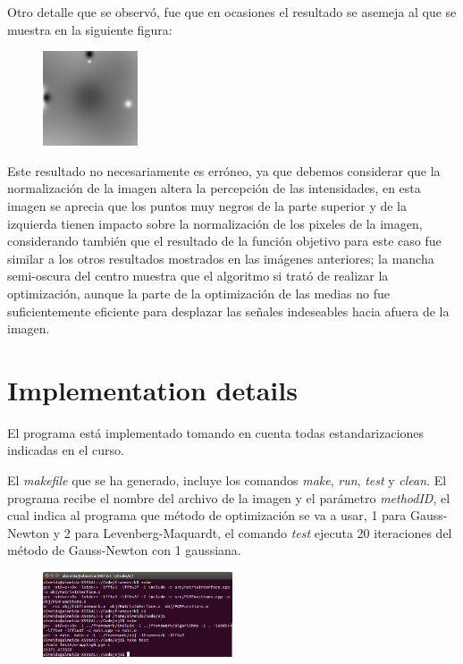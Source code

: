 \documentclass[10pt,journal,compsoc]{styles/IEEEtran}
\begin{document}
Otro detalle que se observ\'o, fue que en ocasiones el resultado se asemeja al que se muestra en la siguiente figura:\\

\begin{figure}[H]
\centering
\includegraphics[width=0.25\textwidth]{case.png}
\caption*{}
\end{figure}

Este resultado no necesariamente es erróneo, ya que debemos considerar que la normalización de la imagen altera la percepción de las intensidades, en esta imagen se aprecia que los puntos muy negros de la parte superior y de la izquierda tienen impacto sobre la normalización de los pixeles de la imagen, considerando también que el resultado de la función objetivo para este caso fue similar a los otros resultados mostrados en las imágenes anteriores; la mancha semi-oscura del centro muestra que el algoritmo si trat\'o de realizar la optimización, aunque la parte de la optimización de las medias no fue suficientemente eficiente para desplazar las señales indeseables hacia afuera de la imagen.\\ 





\appendix
\section{Implementation details}
El programa est\'a implementado tomando en cuenta todas estandarizaciones indicadas en el curso.

El \textit{makefile} que se ha generado, incluye los comandos \textit{make}, \textit{run}, \textit{test} y \textit{clean}. El programa recibe el nombre del archivo de la imagen y el parámetro \textit{methodID}, el cual indica al programa que método de optimización se va a usar, 1 para Gauss-Newton y 2 para Levenberg-Maquardt, el comando \textit{test} ejecuta 20 iteraciones del método de Gauss-Newton con 1 gaussiana.\\

\begin{figure}[H]
\centering
\includegraphics[width=0.5\textwidth]{screen.png}
\caption*{}
\end{figure}
\end{document}
